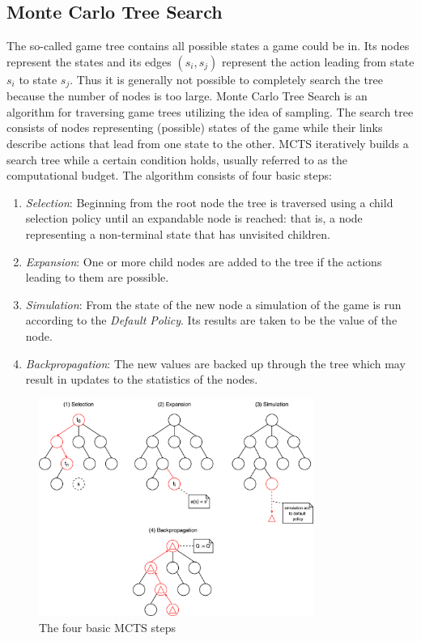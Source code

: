 \subsection{Monte Carlo Tree Search}
The so-called game tree contains all possible states a game could be in. Its nodes represent the states and its edges $(s_i,s_j)$ represent the action leading from state $s_i$ to state $s_j$. Thus it is generally not possible to completely search the tree because the number of nodes is too large. Monte Carlo Tree Search is an algorithm for traversing game trees utilizing the idea of sampling. The search tree consists of nodes representing (possible) states of the game while their links describe actions that lead from one state to the other. MCTS iteratively builds a search tree while a certain condition holds, usually referred to as the computational budget. The algorithm consists of four basic steps:
\begin{enumerate}[label=\arabic*)]
    \item \textit{Selection}: Beginning from the root node the tree is traversed using a child selection policy until an expandable node is reached: that is, a node representing a non-terminal state that has unvisited children.
    \item \textit{Expansion}: One or more child nodes are added to the tree if the actions leading to them are possible.
    \item \textit{Simulation}: From the state of the new node a simulation of the game is run according to the \textit{Default Policy}. Its results are taken to be the value of the node.
    \item \textit{Backpropagation}: The new values are backed up through the tree which may result in updates to the statistics of the nodes.
\end{enumerate}
\begin{figure}[htbp]
    \centering
    \includegraphics[width=0.8\textwidth]{img/mcts-basics.png}
    \caption{The four basic MCTS steps}
    \label{fig:mcts_basics}
\end{figure}

